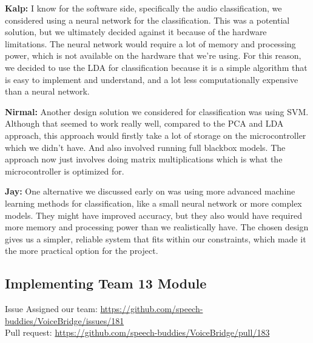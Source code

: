 \documentclass[12pt, titlepage]{article}
\begin{document}
\begin{enumerate}
  \textbf{Kalp:} I know for the software side, specifically the audio
  classification, we considered using a neural network for the classification.
  This was a potential solution, but we ultimately decided against it because of
  the hardware limitations. The neural network would require a lot of memory and
  processing power, which is not available on the hardware that we're using. For
  this reason, we decided to use the LDA for classification because it is a
  simple algorithm that is easy to implement and understand, and a lot less
  computationally expensive than a neural network.

  \textbf{Nirmal:} Another design solution we considered for classification was
  using SVM. Although that seemed to work really well, compared to the PCA and
  LDA approach, this approach would firstly take a lot of storage on the
  microcontroller which we didn't have. And also involved running full blackbox
  models. The approach now just involves doing matrix multiplications which is
  what the microcontroller is optimized for. 

  \textbf{Jay:} One alternative we discussed early on was using more advanced
  machine learning methods for classification, like a small neural network or
  more complex models. They might have improved accuracy, but they also would
  have required more memory and processing power than we realistically have. The
  chosen design gives us a simpler, reliable system that fits within our
  constraints, which made it the more practical option for the project. 

\end{enumerate}

\subsection*{Implementing Team 13 Module}

Issue Assigned our team:
\url{https://github.com/speech-buddies/VoiceBridge/issues/181} \\
Pull request: \url{https://github.com/speech-buddies/VoiceBridge/pull/183} \\
\end{document}
